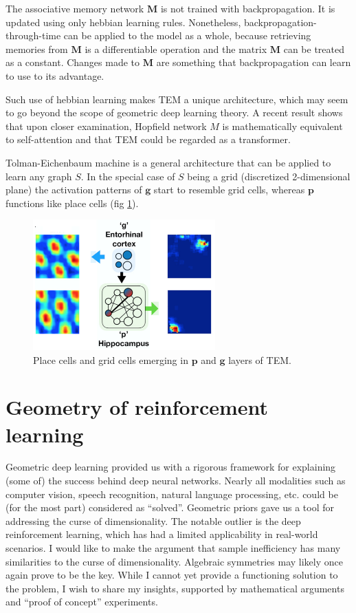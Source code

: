 \documentclass[oneside,english,logo]{amuthesis}
\begin{document}
The associative memory network $\boldsymbol{M}$ is not trained with backpropagation. It is updated using only hebbian learning rules. Nonetheless, backpropagation-through-time can be applied to the model as a whole, because  retrieving memories from $\boldsymbol{M}$ is a differentiable operation and the matrix $\boldsymbol{M}$ can be treated as a constant. Changes made to $\boldsymbol{M}$ are something that backpropagation can learn to use to its advantage. 

Such use of hebbian learning makes TEM a unique architecture, which may seem to go beyond the scope of geometric deep learning theory. A recent result \cite{TEM_as_teransformer} shows that upon closer examination, Hopfield network $M$ is mathematically equivalent to self-attention and that TEM could be regarded as a transformer. 

Tolman-Eichenbaum machine is a general architecture that can be applied to learn any graph $S$. In the special case of $S$ being a grid (discretized 2-dimensional plane) the activation patterns of $\boldsymbol{g}$ start to resemble grid cells, whereas $\boldsymbol{p}$ functions like place cells (fig \ref{fig:tolman_eich_results}).
\begin{figure}[!htbp]
	\centering
	\includegraphics[width=7cm]{tolman_eich_results}
	\caption{Place cells and grid cells emerging in $\boldsymbol{p}$ and $\boldsymbol{g}$ layers of TEM.}
	\label{fig:tolman_eich_results}
\end{figure} 

\chapter{Geometry of reinforcement learning}

Geometric deep learning provided us with a rigorous framework for explaining (some of) the success behind deep neural networks. Nearly all modalities such as computer vision, speech recognition, natural language processing, etc. could be (for the most part) considered as ``solved''. Geometric priors gave us a tool for addressing the curse of dimensionality.
The notable outlier is the deep reinforcement learning, which has had a limited applicability in real-world scenarios. I would like to make the argument that sample inefficiency has many similarities to the curse of dimensionality. Algebraic symmetries may likely once again prove to be the key. While I cannot yet provide a functioning solution to the problem, I wish to share my insights, supported by mathematical arguments and ``proof of concept'' experiments. 
\end{document}
